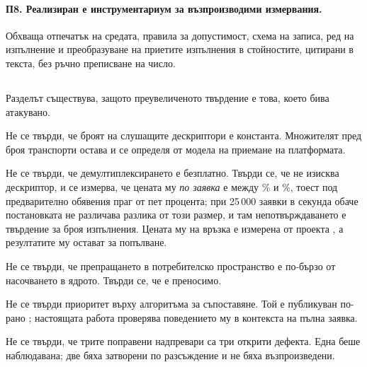 \paragraph{П8. Реализиран е инструментариум за възпроизводими измервания.}
Обхваща отпечатък на средата, правила за допустимост, схема на записа, ред на изпълнение и
преобразуване на приетите изпълнения в стойностите, цитирани в текста, без ръчно преписване
на число.

\subsection*{}

Разделът съществува, защото преувеличеното твърдение е това, което бива атакувано.

Не се твърди, че броят на слушащите дескриптори е константа. Множителят пред броя транспорти
остава и се определя от модела на приемане на платформата.

Не се твърди, че демултиплексирането е безплатно. Твърди се, че не изисква дескриптор, и се
измерва, че цената му \emph{по заявка} е между \% и
\%, тоест под предварително обявения праг от пет процента; при
25\,000 заявки в секунда обаче постановката не различава разлика от този размер, и там
непотвърждаването е твърдение за броя изпълнения. Цената му на връзка е измерена от проекта
, а резултатите му остават за попълване.

Не се твърди, че препращането в потребителско пространство е по-бързо от насочването в
ядрото. Твърди се, че е преносимо.

Не се твърди приоритет върху алгоритъма за съпоставяне. Той е публикуван по-рано
\cite{stankov2024regex}; настоящата работа проверява поведението му в контекста на пълна
заявка.

Не се твърди, че трите поправени надпревари са три открити дефекта. Една беше наблюдавана;
две бяха затворени по разсъждение и не бяха възпроизведени.
